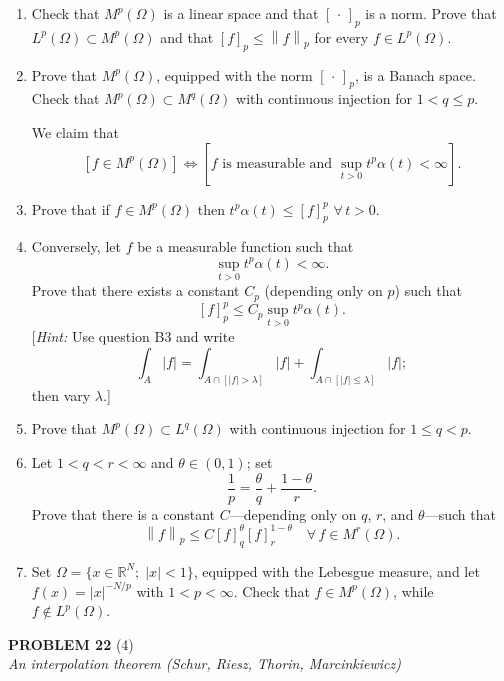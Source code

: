 \documentclass[12pt]{article}
\newcommand{\norm}[1]{\left\|#1\right\|}
\newcommand{\abs}[1]{\left|#1\right|}
\newcommand{\R}{\mathbb{R}}
\begin{document}
\begin{enumerate}
\item Check that $M^p(\Omega)$ is a linear space and that $[\,\cdot\,]_p$ is a norm. Prove that
$L^p(\Omega) \subset M^p(\Omega)$ and that $[f]_p \le \norm{f}_p$ for every $f \in L^p(\Omega)$.
 
\item Prove that $M^p(\Omega)$, equipped with the norm $[\,\cdot\,]_p$, is a Banach space.
Check that $M^p(\Omega) \subset M^q(\Omega)$ with continuous injection for $1 < q \le p$.
 
We claim that
\[
[f \in M^p(\Omega)] \iff [f \text{ is measurable and } \sup_{t>0} t^p \alpha(t) < \infty].
\]
 
\item Prove that if $f \in M^p(\Omega)$ then $t^p\alpha(t) \le [f]_p^p$ $\forall\, t > 0$.
 
\item Conversely, let $f$ be a measurable function such that
\[
\sup_{t>0} t^p \alpha(t) < \infty.
\]
Prove that there exists a constant $C_p$ (depending only on $p$) such that
\[
[f]_p^p \le C_p \sup_{t>0} t^p\alpha(t).
\]
[\textit{Hint:} Use question B3 and write
\[
\int_A \abs{f} = \int_{A \cap [\abs{f}>\lambda]} \abs{f} + \int_{A \cap [\abs{f}\le\lambda]} \abs{f};
\]
then vary $\lambda$.]
 
\item Prove that $M^p(\Omega) \subset L^q(\Omega)$ with continuous injection for $1 \le q < p$.
 
\item Let $1 < q < r < \infty$ and $\theta \in (0,1)$; set
\[
\frac{1}{p} = \frac{\theta}{q} + \frac{1-\theta}{r}.
\]
Prove that there is a constant $C$---depending only on $q$, $r$, and $\theta$---such that
\[
\norm{f}_p \le C[f]_q^\theta [f]_r^{1-\theta} \quad \forall\, f \in M^r(\Omega).
\]
 
\item Set $\Omega = \{x \in \R^N;\; \abs{x} < 1\}$, equipped with the Lebesgue measure, and let
$f(x) = \abs{x}^{-N/p}$ with $1 < p < \infty$. Check that $f \in M^p(\Omega)$, while $f \notin L^p(\Omega)$.
\end{enumerate}
 
\bigskip
 
\noindent\textbf{PROBLEM 22} (4)\\[4pt]
\textit{An interpolation theorem (Schur, Riesz, Thorin, Marcinkiewicz)}
 
\end{document}
